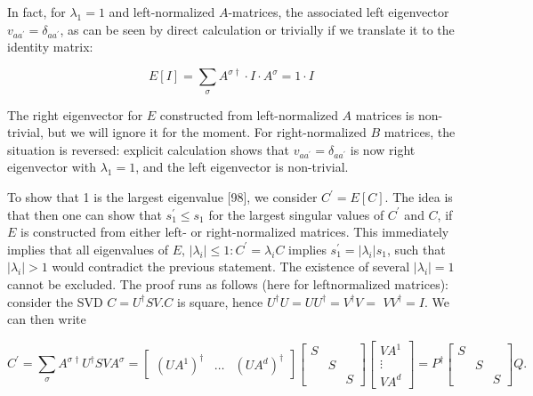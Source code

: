 \documentclass[12pt]{article}
\begin{document}
In fact, for $\lambda_{1}=1$ and left-normalized $A$-matrices, the associated left eigenvector $v_{a a^{\prime}}=\delta_{a a^{\prime}}$, as can be seen by direct calculation or trivially if we translate it to the identity matrix:


\begin{equation*}
E[I]=\sum_{\sigma} A^{\sigma \dagger} \cdot I \cdot A^{\sigma}=1 \cdot I \tag{111}
\end{equation*}


The right eigenvector for $E$ constructed from left-normalized $A$ matrices is non-trivial, but we will ignore it for the moment. For right-normalized $B$ matrices, the situation is reversed: explicit calculation shows that $v_{a a^{\prime}}=\delta_{a a^{\prime}}$ is now right eigenvector with $\lambda_{1}=1$, and the left eigenvector is non-trivial.

To show that 1 is the largest eigenvalue [98], we consider $C^{\prime}=E[C]$. The idea is that then one can show that $s_{1}^{\prime} \leq s_{1}$ for the largest singular values of $C^{\prime}$ and $C$, if $E$ is constructed from either left- or right-normalized matrices. This immediately implies that all eigenvalues of $E$, $\left|\lambda_{i}\right| \leq 1: C^{\prime}=\lambda_{i} C$ implies $s_{1}^{\prime}=\left|\lambda_{i}\right| s_{1}$, such that $\left|\lambda_{i}\right|>1$ would contradict the previous statement. The existence of several $\left|\lambda_{i}\right|=1$ cannot be excluded. The proof runs as follows (here for leftnormalized matrices): consider the SVD $C=U^{\dagger} S V . C$ is square, hence $U^{\dagger} U=U U^{\dagger}=V^{\dagger} V=$ $V V^{\dagger}=I$. We can then write

$$
C^{\prime}=\sum_{\sigma} A^{\sigma \dagger} U^{\dagger} S V A^{\sigma}=\left[\begin{array}{lll}
\left(U A^{1}\right)^{\dagger} & \ldots & \left(U A^{d}\right)^{\dagger}
\end{array}\right]\left[\begin{array}{lll}
S & & \\
& S & \\
& & S
\end{array}\right]\left[\begin{array}{c}
V A^{1} \\
\vdots \\
V A^{d}
\end{array}\right]=P^{\dagger}\left[\begin{array}{lll}
S & & \\
& S & \\
& & S
\end{array}\right] Q .
$$
\end{document}
